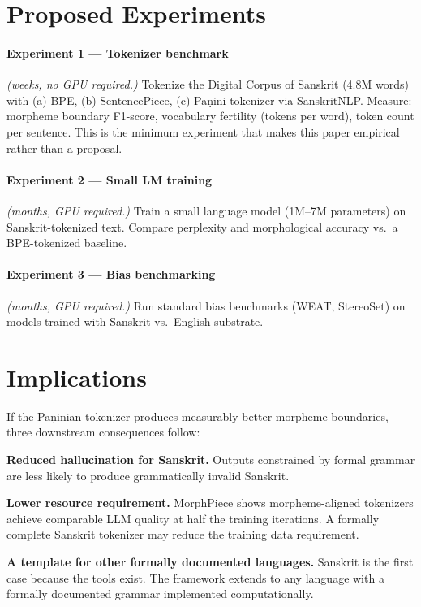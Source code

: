 \documentclass[11pt]{article}
\begin{document}
\section{Proposed Experiments}

\paragraph{Experiment 1 --- Tokenizer benchmark} \textit{(weeks, no GPU required.)}
Tokenize the Digital Corpus of Sanskrit (4.8M words) with (a) BPE, (b) SentencePiece, (c) P\={a}\d{n}ini tokenizer via SanskritNLP. Measure: morpheme boundary F1-score, vocabulary fertility (tokens per word), token count per sentence. This is the minimum experiment that makes this paper empirical rather than a proposal.

\paragraph{Experiment 2 --- Small LM training} \textit{(months, GPU required.)}
Train a small language model (1M--7M parameters) on Sanskrit-tokenized text. Compare perplexity and morphological accuracy vs.\ a BPE-tokenized baseline.

\paragraph{Experiment 3 --- Bias benchmarking} \textit{(months, GPU required.)}
Run standard bias benchmarks (WEAT, StereoSet) on models trained with Sanskrit vs.\ English substrate.

\section{Implications}

If the P\={a}\d{n}inian tokenizer produces measurably better morpheme boundaries, three downstream consequences follow:

\textbf{Reduced hallucination for Sanskrit.} Outputs constrained by formal grammar are less likely to produce grammatically invalid Sanskrit.

\textbf{Lower resource requirement.} MorphPiece \citep{jabbar2023} shows morpheme-aligned tokenizers achieve comparable LLM quality at half the training iterations. A formally complete Sanskrit tokenizer may reduce the training data requirement.

\textbf{A template for other formally documented languages.} Sanskrit is the first case because the tools exist. The framework extends to any language with a formally documented grammar implemented computationally.
\end{document}
